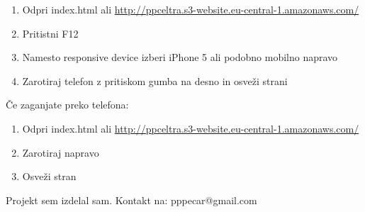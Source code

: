 \documentclass[a4paper,11pt]{article}
\begin{document}
\begin{enumerate}
	\item Odpri index.html ali \url{http://ppceltra.s3-website.eu-central-1.amazonaws.com/}
	\item Pritistni F12
	\item Namesto responsive device izberi iPhone 5 ali podobno mobilno napravo
	\item Zarotiraj telefon z pritiskom gumba na desno in osveži strani
\end{enumerate}

Če zaganjate preko telefona:
\begin{enumerate}
	\item Odpri index.html ali \url{http://ppceltra.s3-website.eu-central-1.amazonaws.com/}
	\item Zarotiraj napravo
	\item Osveži stran
\end{enumerate}

Projekt sem izdelal sam. Kontakt na: pppecar@gmail.com
\end{document}
